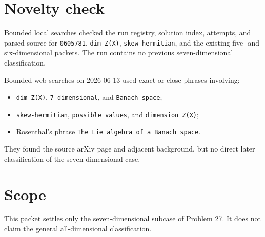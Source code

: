 \documentclass[11pt]{article}
\begin{document}
\section*{Novelty check}

Bounded local searches checked the run registry, solution index, attempts,
and parsed source for \texttt{0605781}, \texttt{dim Z(X)},
\texttt{skew-hermitian}, and the existing five- and six-dimensional packets.
The run contains no previous seven-dimensional classification.

Bounded web searches on 2026-06-13 used exact or close phrases involving:
\begin{itemize}
\item \texttt{dim Z(X)}, \texttt{7-dimensional}, and \texttt{Banach space};
\item \texttt{skew-hermitian}, \texttt{possible values}, and
\texttt{dimension Z(X)};
\item Rosenthal's phrase \texttt{The Lie algebra of a Banach space}.
\end{itemize}
They found the source arXiv page and adjacent background, but no direct later
classification of the seven-dimensional case.

\section*{Scope}

This packet settles only the seven-dimensional subcase of Problem 27. It does
not claim the general all-dimensional classification.
\end{document}
